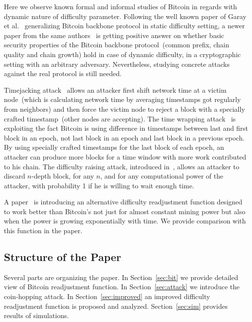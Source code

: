 \documentclass[]{llncs}
\begin{document}
Here we observe known formal and informal studies of Bitcoin in regards with dynamic nature of difficulty parameter. Following the well known paper of Garay et al.~\cite{garay2015bitcoin} generalizing Bitcoin backbone protocol in static difficulty setting, a newer paper from the same authors~\cite{gkl16} is getting positive answer on whether basic security properties of the Bitcoin backbone protocol~(common prefix, chain quality and chain growth) hold in case of dynamic difficulty, in a cryptographic setting with an arbitrary adversary. Nevertheless, studying concrete attacks against the real protocol is still needed.      

Timejacking attack~\cite{timejacking2011} allows an attacker first shift network time at a victim node~(which is calculating network time by averaging timestamps got regularly from neighbors) and then force the victim node to reject a block with a specially crafted timestamp~(other nodes are accepting). The time wrapping attack~\cite{artforz2011} is exploiting the fact Bitcoin is using difference in timestamps between last and first block in an epoch, not last block in an epoch and last block in a previous epoch. By using specially crafted timestamps for the last block of each epoch, an attacker can produce more blocks for a time window with more work contributed to his chain. The difficulty raising attack, introduced in~\cite{bahack2013theoretical}, allows an attacker to discard $n$-depth block, for any $n$, and for any computational power of the attacker, with probability 1 if he is willing to wait enough time.

A paper~\cite{kraft2015difficulty} is introducing an alternative difficulty readjustment function designed to work better than Bitcoin's not just for almost constant mining power but also when the power is growing exponentially with time. We provide comparison with this function in the paper.  

\subsection{Structure of the Paper}

Several parts are organizing the paper. In Section~\ref{sec:bit} we provide detailed view of Bitcoin readjustment function. In Section~\ref{sec:attack} we introduce the coin-hopping attack. In Section~\ref{sec:improved} an improved difficulty readjustment function is proposed and analyzed. Section~\ref{sec:sim} provides results of simulations. 
\end{document}
